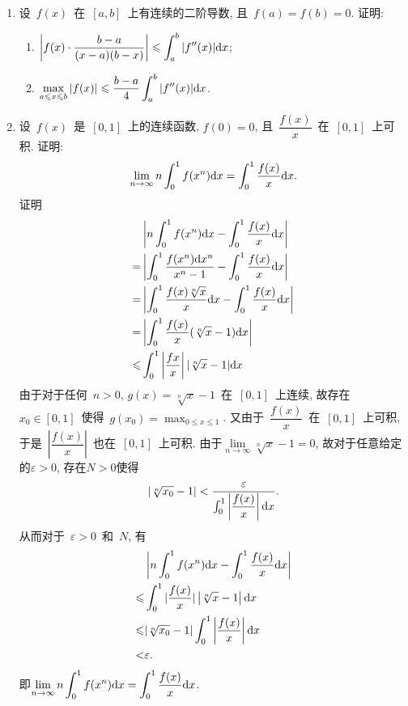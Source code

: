 \documentclass[UTF8,a4paper,20pt]{article}
\begin{document}
\begin{enumerate}
\item 设~$f(x)$~在~$[a,b]$~上有连续的二阶导数, 且~$f(a)=f(b)=0$. 证明:
	\begin{enumerate}[(1)]
	\item $\displaystyle \left|f(x)\cdot\dfrac{b-a}{(x-a)(b-x)}\right|\leqslant\int_a^b |f''(x)|\mathrm{d}x$;
	\item $\displaystyle \max\limits_{a\leqslant x\leqslant b}|f(x)|\leqslant\dfrac{b-a}{4}\int_a^b|f''(x)|\mathrm{d}x$.
	\end{enumerate}

\item 设~$f(x)$~是~$[0,1]$~上的连续函数, $f(0)=0$, 且~$\dfrac{f(x)}{x}$~在~$[0,1]$~上可积. 证明:
\[ \lim_{n\to\infty} n\int_0^1 f(x^n)\mathrm{d}x=\int_0^1\dfrac{f(x)}{x}\mathrm{d}x. \]
{\heiti 证明}\\
\begin{equation*}
	\begin{split}
	&\left|n\int_0^1 f(x^n)\mathrm{d}x-\int_0^1 \dfrac{f(x)}{x}\mathrm{d}x\right|\\
	=&\left|\int_0^1 \dfrac{f(x^n)\mathrm{d}x^n}{x^n-1}-\int_0^1 \dfrac{f(x)}{x}\mathrm{d}x\right|\\
	=&\left|\int_0^1 \dfrac{f(x)\sqrt[n]{x}}{x}\mathrm{d}x-\int_0^1 \dfrac{f(x)}{x}\mathrm{d}x\right|\\
	=&\left|\int_0^1 \dfrac{f(x)}{x}(\sqrt[n]{x}-1)\mathrm{d}x\right|\\
	\leqslant& \int_0^1\left|\dfrac{f{x}}{x}\right||\sqrt[n]{x}-1|\mathrm{d}x
	\end{split}
\end{equation*}
由于对于任何~$n>0$, $g(x)=\sqrt[n]{x}-1$~在~$[0,1]$~上连续, 故存在~$x_0\in[0,1]$~使得~$g(x_0)=\max_{0\leqslant x\leqslant 1}$. 又由于~$\dfrac{f(x)}{x}$~在~$[0,1]$~上可积, 于是~$\left|\dfrac{f(x)}{x}\right|$~也在~$[0,1]$~上可积. 由于$\lim\limits_{n\to\infty}\sqrt[n]{x}-1=0$, 故对于任意给定的$\varepsilon>0$, 存在$N>0$使得
\[|\sqrt[n]{x_0}-1|<\dfrac{\varepsilon}{\int_0^1\left|\dfrac{f(x)}{x}\right|\mathrm{d}x}.\]
从而对于~$\varepsilon>0$~和~$N$, 有
\begin{equation*}
	\begin{split}
	&\left|n\int_0^1 f(x^n)\mathrm{d}x-\int_0^1 \dfrac{f(x)}{x}\mathrm{d}x\right|\\
	\leqslant& \int_0^1|\dfrac{f(x)}{x}|\left|\sqrt[n]{x}-1\right|\mathrm{d}x\\
	\leqslant& |\sqrt[n]{x_0}-1|\int_0^1 \left|\dfrac{f(x)}{x}\right|\mathrm{d}x\\
	<&\varepsilon.
	\end{split}
\end{equation*}
即$\displaystyle\lim\limits_{n\to\infty} n\int_0^1 f(x^n)\mathrm{d}x=\int_0^1\dfrac{f(x)}{x}\mathrm{d}x$.
\end{enumerate}
\end{document}
